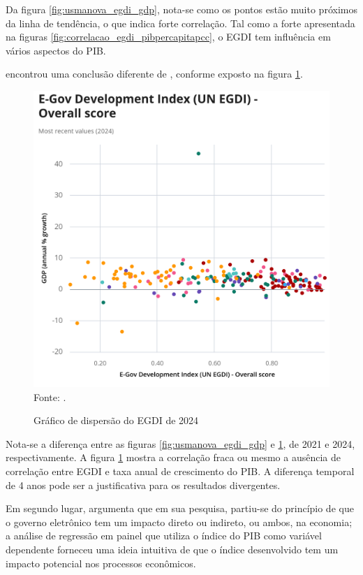 Da figura \ref{fig:usmanova_egdi_gdp}, nota-se como os pontos estão muito próximos da linha de tendência, o que indica forte correlação. Tal como a forte apresentada na figuras \ref{fig:correlacao_egdi_pibpercapitapcc}, o EGDI tem influência em vários aspectos do PIB.

\cite{scatterplot_egdi_2024} encontrou uma conclusão diferente de \cite{alisherovna2021whether}, conforme exposto na figura \ref{fig:UN_EGDI_EGDI_scatter}.

\begin{figure}[H]
	\centering
	\caption{Gráfico de dispersão do EGDI de 2024}
	\includegraphics[width=1\linewidth]{figuras/UN_EGDI_EGDI_scatter}
	\label{fig:UN_EGDI_EGDI_scatter}
	\footnotesize{Fonte: \cite{scatterplot_egdi_2024}.}
\end{figure}

Nota-se a diferença entre as figuras \ref{fig:usmanova_egdi_gdp} e \ref{fig:UN_EGDI_EGDI_scatter}, de 2021 e 2024, respectivamente. A figura \ref{fig:UN_EGDI_EGDI_scatter} mostra a correlação fraca ou mesmo a ausência de correlação entre EGDI e taxa anual de crescimento do PIB. A diferença temporal de 4 anos pode ser a justificativa para os resultados divergentes.

Em segundo lugar, \cite{kotenok2020government} argumenta que em sua pesquisa, partiu-se do princípio de que o governo eletrônico tem um impacto direto ou indireto, ou ambos, na economia; a análise de regressão em painel que utiliza o índice do PIB como variável dependente forneceu uma ideia intuitiva de que o índice desenvolvido tem um impacto potencial nos processos econômicos.


